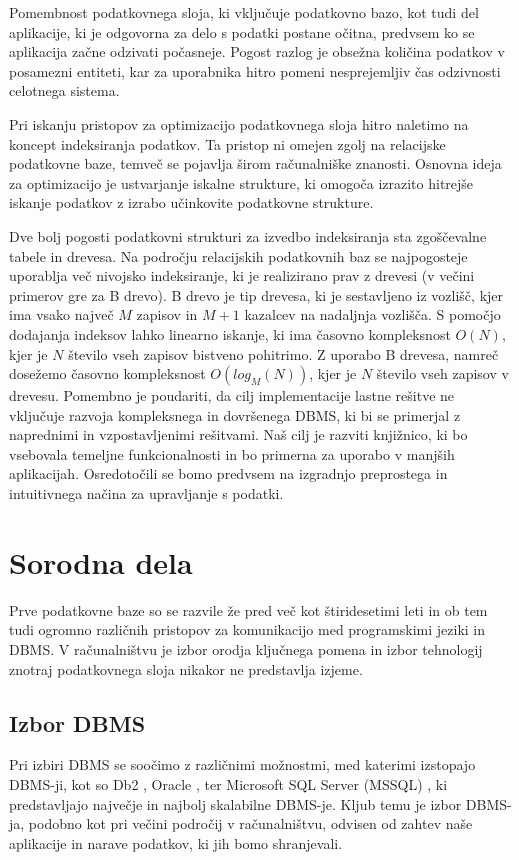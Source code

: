 \documentclass[a4paper,12pt,openright]{book}
\begin{document}
    Pomembnost podatkovnega sloja, ki vključuje podatkovno bazo, kot tudi del aplikacije, ki je odgovorna za delo s podatki postane očitna, predvsem ko se aplikacija začne odzivati počasneje. Pogost razlog je obsežna količina podatkov v posamezni entiteti, kar za uporabnika hitro pomeni nesprejemljiv čas odzivnosti celotnega sistema.

    Pri iskanju pristopov za optimizacijo podatkovnega sloja hitro naletimo na koncept indeksiranja podatkov. Ta pristop ni omejen zgolj na relacijske podatkovne baze, temveč se pojavlja širom računalniške znanosti. Osnovna ideja za optimizacijo je ustvarjanje iskalne strukture, ki omogoča izrazito hitrejše iskanje podatkov z izrabo učinkovite podatkovne strukture.
    
    Dve bolj pogosti podatkovni strukturi za izvedbo indeksiranja sta zgoščevalne tabele in drevesa. Na področju relacijskih podatkovnih baz se najpogosteje uporablja več nivojsko indeksiranje, ki je realizirano prav z drevesi (v večini primerov gre za B drevo). B drevo je tip drevesa, ki je sestavljeno iz vozlišč, kjer ima vsako največ $M$ zapisov in $M+1$ kazalcev na nadaljnja vozlišča. S pomočjo dodajanja indeksov lahko linearno iskanje, ki ima časovno kompleksnost $O(N)$, kjer je $N$ število vseh zapisov bistveno pohitrimo. Z uporabo B drevesa, namreč dosežemo časovno kompleksnost $O(log_M(N))$, kjer je $N$ število vseh zapisov v drevesu.
    \newline
    \newline
    \noindent
    Pomembno je poudariti, da cilj implementacije lastne rešitve ne vključuje razvoja kompleksnega in dovršenega DBMS, ki bi se primerjal z naprednimi in vzpostavljenimi rešitvami. Naš cilj je razviti knjižnico, ki bo vsebovala temeljne funkcionalnosti in bo primerna za uporabo v manjših aplikacijah. Osredotočili se bomo predvsem na izgradnjo preprostega in intuitivnega načina za upravljanje s podatki.

\chapter{Sorodna dela}

    Prve podatkovne baze so se razvile že pred več kot štiridesetimi leti in ob tem tudi ogromno različnih pristopov za komunikacijo med programskimi jeziki in DBMS. V računalništvu je izbor orodja ključnega pomena in izbor tehnologij znotraj podatkovnega sloja nikakor ne predstavlja izjeme.

    \section{Izbor DBMS}
    Pri izbiri DBMS se soočimo z različnimi možnostmi, med katerimi izstopajo DBMS-ji, kot so Db2 \cite{DB2}, Oracle \cite{ORACLE}, ter Microsoft SQL Server (MSSQL) \cite{MSSQL}, ki predstavljajo največje in najbolj skalabilne DBMS-je. Kljub temu je izbor DBMS-ja, podobno kot pri večini področij v računalništvu, odvisen od zahtev naše aplikacije in narave podatkov, ki jih bomo shranjevali.
\end{document}

